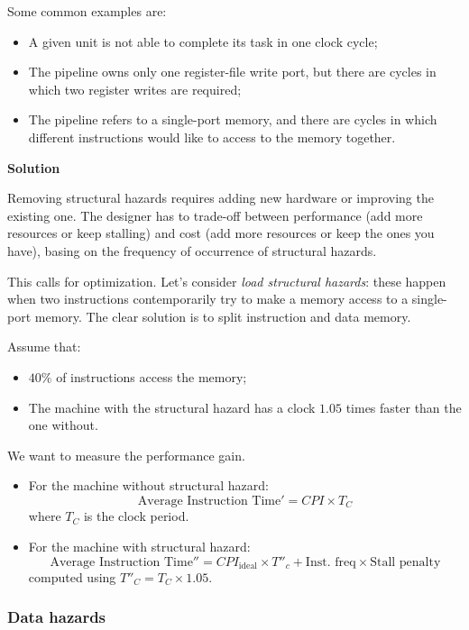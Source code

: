 \documentclass[a4paper,11pt]{article}
\begin{document}
Some common examples are:
\begin{itemize}
	\item A given unit is not able to complete its task in one clock cycle;
	\item The pipeline owns only one register-file write port, but there are cycles in which two register writes are required;
	\item The pipeline refers to a single-port memory, and there are cycles in which different instructions would like to access to the memory together.
\end{itemize}

\par\smallskip
\textbf{\textsf{Solution}}

Removing structural hazards requires adding new hardware or improving the existing one.
The designer has to trade-off between performance (add more resources or keep stalling) and cost (add more resources or keep the ones you have), basing on the frequency of occurrence of structural hazards.

This calls for optimization.
Let's consider \textit{load structural hazards}: these happen when two instructions contemporarily try to make a memory access to a single-port memory.
The clear solution is to split instruction and data memory.

Assume that:
\begin{itemize}
	\item $40 \%$ of instructions access the memory;
	\item The machine with the structural hazard has a clock $1.05$ times faster than the one without.
\end{itemize}

We want to measure the performance gain.

\begin{itemize}
	\item
	      For the machine without structural hazard:
	      $$
		      \text{Average Instruction Time}' = CPI \times T_C
	      $$
	      where $T_C$ is the clock period.

	\item
	      For the machine with structural hazard:
	      $$
		      \text{Average Instruction Time}'' = CPI_\text{ideal} \times T''_c + \text{Inst. freq} \times \text{Stall penalty}
	      $$
	      computed using $T''_C = T_C \times 1.05$.
\end{itemize}

\subsubsection{Data hazards}
\end{document}
